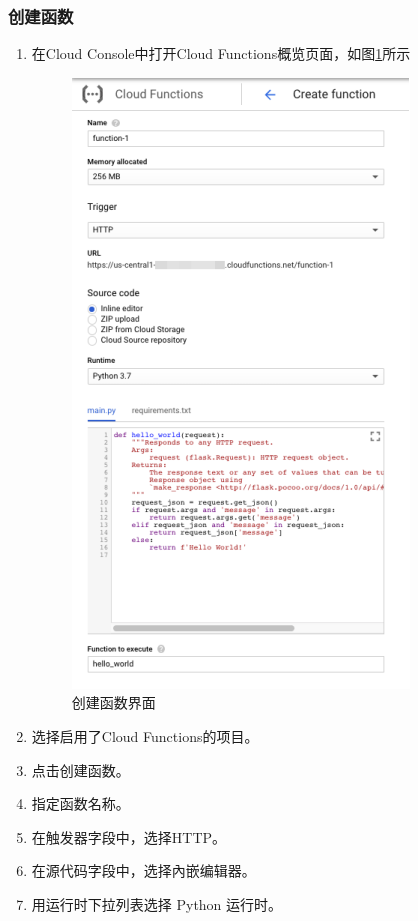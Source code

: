 \documentclass[11pt]{article}
\begin{document}
\subsubsection{创建函数}
\begin{enumerate}
	\item 在Cloud Console中打开Cloud Functions概览页面，如图\ref{fig15}所示
	\begin{figure}[h]	
		\centering
		\includegraphics[scale=0.6]{figs/15.png}        %
		\caption{创建函数界面}
		\label{fig15}	
	\end{figure}
	\item 选择启用了Cloud Functions的项目。
	\item 点击创建函数。
	\item 指定函数名称。
	\item 在触发器字段中，选择HTTP。
	\item 在源代码字段中，选择內嵌编辑器。
	\item 用运行时下拉列表选择 Python 运行时。
\end{enumerate}	
\end{document}
